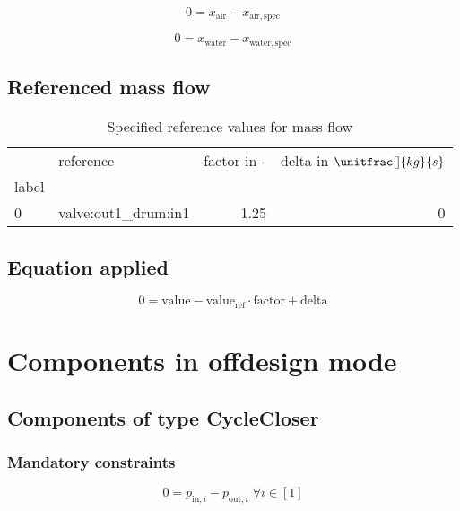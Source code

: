 \begin{equation}
\label{eq:Connection_air}
0 = x_\mathrm{air} - x_\mathrm{air,spec}
\end{equation}

\begin{equation}
\label{eq:Connection_water}
0 = x_\mathrm{water} - x_\mathrm{water,spec}
\end{equation}

\subsection{Referenced mass flow}

\begin{table}[H]
\centering
\caption{Specified reference values for mass flow}
\begin{tabular}{llrr}
\toprule
{} &             reference &  factor in - &  delta in $\unitfrac[]{kg}{s}$ \\
label &                       &              &                                \\
\midrule
0     &  valve:out1\_drum:in1 &         1.25 &                              0 \\
\bottomrule
\end{tabular}
\end{table}
\subsection{Equation applied}

\begin{equation}
\label{eq:Connection_ref}
0 = \text{value} - \text{value}_\mathrm{ref} \cdot \mathrm{factor} + \text{delta}
\end{equation}

\section{Components in offdesign mode}

\subsection{Components of type CycleCloser}

\subsubsection{Mandatory constraints}

\begin{equation}
\label{eq:CycleCloser_pressure_equality_constraints}
0=p_{\mathrm{in,}i}-p_{\mathrm{out,}i}\; \forall i \in [1]
\end{equation}

